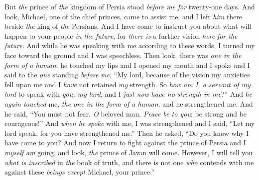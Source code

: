 \begin{biblechapter}
\verse But \textit{the} prince of \textit{the} kingdom of Persia stood \textit{before me} \textit{for} twenty-one days. And look, Michael, one of the chief princes, came to assist me, and I left \textit{him} there beside \textit{the} king of \textit{the} Persians.
\verse And I have come to instruct you about what will happen to your people \textit{in the future}, for \textit{there is} a further vision \textit{here} \textit{for the future}.
\verse And while he was speaking with me according to these words, I turned my face toward the ground and I was speechless.
\verse Then look, there was \textit{one in the form of a human}; he touched my lips and I opened my mouth and I spoke and I said to the \textit{one} standing \textit{before me}, “My lord, because of the vision my anxieties fell upon me and I \textit{have} not retained \textit{my} strength.
\verse So \textit{how am I, a servant of my lord} to speak with \textit{you, my lord}, and I \textit{just now} \textit{have no strength in me}?”
\verse And \textit{he again touched} me, \textit{the one in the form of a human}, and he strengthened me.
\verse And he said, “You must not fear, \textit{O} beloved man. \textit{Peace be to you}; be strong and be courageous!” And \textit{when he spoke} with me, I was strengthened and I said, “Let my lord speak, for you have strengthened me.”
\verse Then he asked, “Do you know why I have come to you? And now I return to fight against the prince of Persia and I \textit{myself} \textit{am} going, and look, \textit{the} prince of Javan will come.
\verse However, I will tell you \textit{what is inscribed} in \textit{the} book of truth, and there is not one \textit{who} contends with me against these \textit{beings} \textit{except} Michael, your prince.”
\end{biblechapter}

